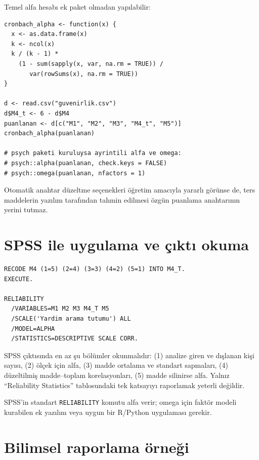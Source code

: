 Temel alfa hesabı ek paket olmadan yapılabilir:

\begin{lstlisting}[style=prismR,caption={R ile alfa hesabı ve omega için model temelli seçenek}]
cronbach_alpha <- function(x) {
  x <- as.data.frame(x)
  k <- ncol(x)
  k / (k - 1) *
    (1 - sum(sapply(x, var, na.rm = TRUE)) /
       var(rowSums(x), na.rm = TRUE))
}

d <- read.csv("guvenirlik.csv")
d$M4_t <- 6 - d$M4
puanlanan <- d[c("M1", "M2", "M3", "M4_t", "M5")]
cronbach_alpha(puanlanan)

# psych paketi kuruluysa ayrintili alfa ve omega:
# psych::alpha(puanlanan, check.keys = FALSE)
# psych::omega(puanlanan, nfactors = 1)
\end{lstlisting}

Otomatik anahtar düzeltme seçenekleri öğretim amacıyla yararlı görünse de,
ters maddelerin yazılım tarafından tahmin edilmesi özgün puanlama anahtarının
yerini tutmaz.

\section{SPSS ile uygulama ve çıktı okuma}

\begin{lstlisting}[style=prismSPSS,caption={SPSS ile ters puanlama ve alfa analizi}]
RECODE M4 (1=5) (2=4) (3=3) (4=2) (5=1) INTO M4_T.
EXECUTE.

RELIABILITY
  /VARIABLES=M1 M2 M3 M4_T M5
  /SCALE('Yardim arama tutumu') ALL
  /MODEL=ALPHA
  /STATISTICS=DESCRIPTIVE SCALE CORR.
\end{lstlisting}

\begin{outputguidebox}
SPSS çıktısında en az şu bölümler okunmalıdır: (1) analize giren ve dışlanan
kişi sayısı, (2) ölçek için alfa, (3) madde ortalama ve standart sapmaları,
(4) düzeltilmiş madde--toplam korelasyonları, (5) madde silinirse alfa.
Yalnız ``Reliability Statistics'' tablosundaki tek katsayıyı raporlamak
yeterli değildir.
\end{outputguidebox}

SPSS'in standart \texttt{RELIABILITY} komutu alfa verir; omega için faktör
modeli kurabilen ek yazılım veya uygun bir R/Python uygulaması gerekir.

\section{Bilimsel raporlama örneği}

